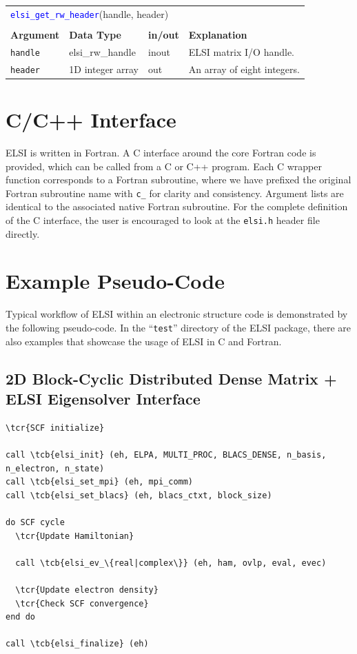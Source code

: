 \documentclass{report}
\newcommand{\tcb}[1]{\textcolor{blue}{#1}}
\newcommand{\tcr}[1]{\textcolor{red}{#1}}
\newcommand{\api}[1]{\textcolor{blue}{\texttt{#1}}}
\begin{document}
\begin{tabular}[]{|p{20mm}|p{40mm}|p{10mm}|p{92mm}|}
\multicolumn{4}{l}{\api{elsi\_get\_rw\_header}(handle, header)}\\
\multicolumn{4}{l}{}\\
\hline
\multicolumn{1}{|l|}{\textbf{Argument}} & \multicolumn{1}{l|}{\textbf{Data Type}} & \multicolumn{1}{l|}{\textbf{in/out}} & \multicolumn{1}{l|}{\textbf{Explanation}}\\
\hline
\texttt{handle} & elsi\_rw\_handle  & inout & ELSI matrix I/O handle.\\
\hline
\texttt{header} & 1D integer array  & out   & An array of eight integers.\\
\hline
\end{tabular}

\section{C/C++ Interface}
\label{sec:c}
ELSI is written in Fortran. A C interface around the core Fortran code is provided, which can be called from a C or C++ program. Each C wrapper function corresponds to a Fortran subroutine, where we have prefixed the original Fortran subroutine name with \texttt{c\_} for clarity and consistency. Argument lists are identical to the associated native Fortran subroutine. For the complete definition of the C interface, the user is encouraged to look at the \texttt{elsi.h} header file directly.

\section{Example Pseudo-Code}
\label{sec:example}
Typical workflow of ELSI within an electronic structure code is demonstrated by the following pseudo-code. In the ``\texttt{test}'' directory of the ELSI package, there are also examples that showcase the usage of ELSI in C and Fortran.

\subsection*{2D Block-Cyclic Distributed Dense Matrix + ELSI Eigensolver Interface}
\begin{tcolorbox}
\begin{Verbatim}[commandchars=\\\{\}]
\tcr{SCF initialize}

call \tcb{elsi_init} (eh, ELPA, MULTI_PROC, BLACS_DENSE, n_basis, n_electron, n_state)
call \tcb{elsi_set_mpi} (eh, mpi_comm)
call \tcb{elsi_set_blacs} (eh, blacs_ctxt, block_size)

do SCF cycle
  \tcr{Update Hamiltonian}

  call \tcb{elsi_ev_\{real|complex\}} (eh, ham, ovlp, eval, evec)

  \tcr{Update electron density}
  \tcr{Check SCF convergence}
end do

call \tcb{elsi_finalize} (eh)
\end{Verbatim}
\end{tcolorbox}
\end{document}
